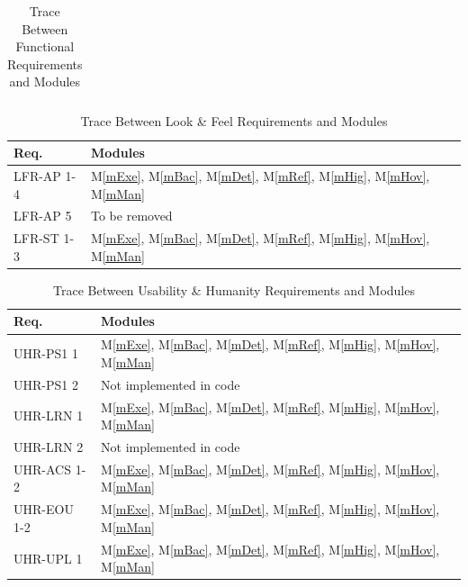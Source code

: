 \documentclass[12pt, titlepage]{article}
\newcommand{\mref}[1]{M\ref{#1}}
\begin{document}
\begin{table}[H]
\begin{tabular}{p{} p{}}
    \bottomrule
  \end{tabular}
  \caption{Trace Between Functional Requirements and Modules}
  \label{tab:fr-mod}
\end{table}

\begin{table}[H]
  \centering
  \begin{tabular}{p{} p{}}
    \toprule \textbf{Req.} & \textbf{Modules}\\
    \midrule
    LFR-AP 1-4 & \mref{mExe}, \mref{mBac}, \mref{mDet}, \mref{mRef}, \mref{mHig}, \mref{mHov}, \mref{mMan}\\ 
    LFR-AP 5 & To be removed\\ 
    LFR-ST 1-3 & \mref{mExe}, \mref{mBac}, \mref{mDet}, \mref{mRef}, \mref{mHig}, \mref{mHov}, \mref{mMan}\\
    \bottomrule
  \end{tabular}
  \caption{Trace Between Look \& Feel Requirements and Modules}
  \label{tab:LFR-mod}
\end{table}

\begin{table}[H]
  \centering
  \begin{tabular}{p{} p{}}
    \toprule \textbf{Req.} & \textbf{Modules}\\
    \midrule
    UHR-PS1 1 & \mref{mExe}, \mref{mBac}, \mref{mDet}, \mref{mRef}, \mref{mHig}, \mref{mHov}, \mref{mMan}\\ 
    UHR-PS1 2 & Not implemented in code\\ 
    UHR-LRN 1 & \mref{mExe}, \mref{mBac}, \mref{mDet}, \mref{mRef}, \mref{mHig}, \mref{mHov}, \mref{mMan}\\ 
    UHR-LRN 2 & Not implemented in code\\ 
    UHR-ACS 1-2 & \mref{mExe}, \mref{mBac}, \mref{mDet}, \mref{mRef}, \mref{mHig}, \mref{mHov}, \mref{mMan}\\ 
    UHR-EOU 1-2 & \mref{mExe}, \mref{mBac}, \mref{mDet}, \mref{mRef}, \mref{mHig}, \mref{mHov}, \mref{mMan}\\ 
    UHR-UPL 1 & \mref{mExe}, \mref{mBac}, \mref{mDet}, \mref{mRef}, \mref{mHig}, \mref{mHov}, \mref{mMan}\\ 
    \bottomrule
  \end{tabular}
  \caption{Trace Between Usability \& Humanity Requirements and Modules}
  \label{tab:UHR-mod}
\end{table}
\end{document}
